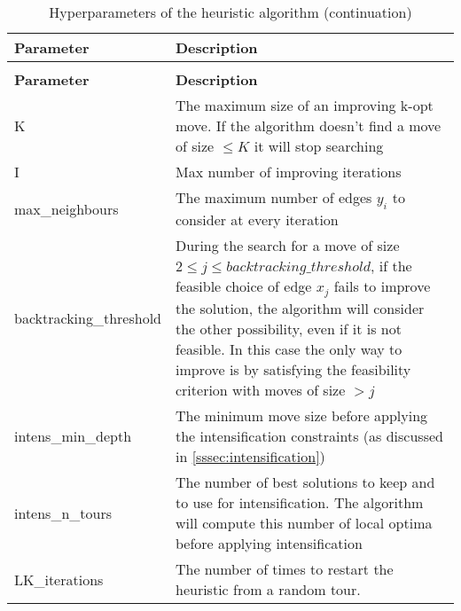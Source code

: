 
\renewcommand{\arraystretch}{1.5}
\setlength{\arrayrulewidth}{1.2pt}
\begin{longtable}{lX}
	\caption{Hyperparameters of the heuristic algorithm}\\
	\hline
	\rowcolor{myred} %
	\color{white}\textbf{Parameter} & \color{white}\textbf{Description}\\
	\hline
	\endfirsthead
	
	\rowcolor{white}
	\caption[]{Hyperparameters of the heuristic algorithm (continuation)}\\
	\hline
	\rowcolor{myred}
	\color{white}\textbf{Parameter} & \color{white}\textbf{Description}\\
	\hline
	\endhead
	\hline %
	\endlastfoot %
	K  & The maximum size of an improving k-opt move. If the algorithm doesn't find a move of size $\le K$ it will stop searching  \\
	I  & Max number of improving iterations \\
	max\_neighbours   & The maximum number of edges $y_i$ to consider at every iteration \\
	backtracking\_threshold & During the search for a move of size $2 \le j \le backtracking\_threshold$, if the feasible choice of edge $x_j$ fails to improve the solution, the algorithm will consider the other possibility, even if it is not feasible. In this case the only way to improve is by satisfying the feasibility criterion with moves of size $> j$\\
	intens\_min\_depth & The minimum move size before applying the intensification constraints (as discussed in \cref{sssec:intensification})\\
	intens\_n\_tours & The number of best solutions to keep and to use for intensification. The algorithm will compute this number of local optima before applying intensification\\
	LK\_iterations & The number of times to restart the heuristic from a random tour.
	\label{tab:hyperparameters} \\
\end{longtable}
\setlength{\arrayrulewidth}{1pt}
\renewcommand{\arraystretch}{1}